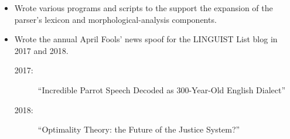 \begin{singlespace}
\begin{itemize}
\item Wrote various programs and scripts to the support the expansion of the parser's lexicon and morphological-analysis components. 
\item Wrote the  annual April Fools' news spoof  for the LINGUIST List blog in 2017 and 2018. %
\begin{description}
\item[2017:] ``Incredible Parrot Speech Decoded as 300-Year-Old English Dialect''
\item[2018:] ``Optimality Theory: the Future of the Justice System?''

\end{description}
\end{itemize}
\end{singlespace}
